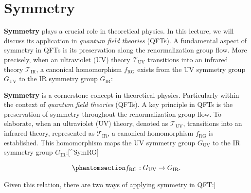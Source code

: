 \documentclass[
  letterpaper,
  DIV=11,
  numbers=noendperiod]{scrreport}
\begin{document}
\section{Symmetry}\label{symmetry}

\textbf{Symmetry} plays a crucial role in theoretical physics. In this
lecture, we will discuss its application in \emph{quantum field
theories} (QFTs). A fundamental aspect of symmetry in QFTs is its
preservation along the renormalization group flow. More precisely, when
an ultraviolet (UV) theory \(\mathcal{T}_\text{UV}\) transitions into an
infrared theory \(\mathcal{T}_\text{IR}\), a canonical homomorphism
\(f_\text{RG}\) exists from the UV symmetry group \(G_\text{UV}\) to the
IR symmetry group \(G_\text{IR}\):

\textbf{Symmetry} is a cornerstone concept in theoretical physics.
Particularly within the context of \emph{quantum field theories} (QFTs).
A key principle in QFTs is the preservation of symmetry throughout the
renormalization group flow. To elaborate, when an ultraviolet (UV)
theory, denoted as \(\mathcal{T}_\text{UV}\), transitions into an
infrared theory, represented as \(\mathcal{T}_\text{IR}\), a canonical
homomorphism \(f_\text{RG}\) is established. This homomorphism maps the
UV symmetry group \(G_\text{UV}\) to the IR symmetry group
\(G_\text{IR}\):{[}\^{}SymRG{]}

\begin{tcolorbox}[enhanced jigsaw, opacityback=0, opacitybacktitle=0.6, leftrule=.75mm, arc=.35mm, coltitle=black, breakable, colframe=quarto-callout-important-color-frame, titlerule=0mm, colback=white, bottomrule=.15mm, left=2mm, colbacktitle=quarto-callout-important-color!10!white, toptitle=1mm, bottomtitle=1mm, title=\textcolor{quarto-callout-important-color}{\faExclamation}\hspace{0.5em}{RG flow homomorphism from UV symmetry to IR symmetry}, rightrule=.15mm, toprule=.15mm]

\begin{equation}\phantomsection\label{eq-RG-group-match}{
f_\text{RG} : G_\text{UV} \to G_\text{IR}.
}\end{equation}

\end{tcolorbox}

Given this relation, there are two ways of applying symmetry in QFT:{]}
\end{document}
